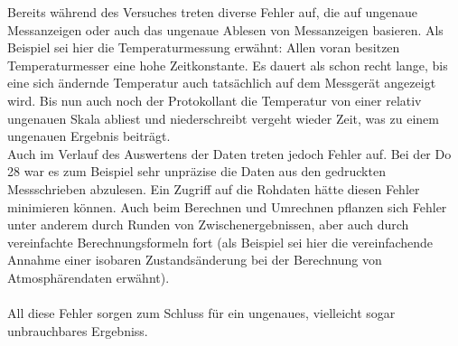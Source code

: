 Bereits während des Versuches treten diverse Fehler auf, die auf ungenaue Messanzeigen oder auch das ungenaue Ablesen von Messanzeigen basieren. Als Beispiel sei hier die Temperaturmessung erwähnt: Allen voran besitzen Temperaturmesser eine hohe Zeitkonstante. Es dauert als schon recht lange, bis eine sich ändernde Temperatur auch tatsächlich auf dem Messgerät angezeigt wird. Bis nun auch noch der Protokollant die Temperatur von einer relativ ungenauen Skala abliest und niederschreibt vergeht wieder Zeit, was zu einem ungenauen Ergebnis beiträgt.\\
Auch im Verlauf des Auswertens der Daten treten jedoch Fehler auf. Bei der Do 28 war es zum Beispiel sehr unpräzise die Daten aus den gedruckten Messschrieben abzulesen. Ein Zugriff auf die Rohdaten hätte diesen Fehler minimieren können. Auch beim Berechnen und Umrechnen pflanzen sich Fehler unter anderem durch Runden von Zwischenergebnissen, aber auch durch vereinfachte Berechnungsformeln fort (als Beispiel sei hier die vereinfachende Annahme einer isobaren Zustandsänderung bei der Berechnung von Atmosphärendaten erwähnt).\\\\
All diese Fehler sorgen zum Schluss für ein ungenaues, vielleicht sogar unbrauchbares Ergebniss.

\newpage


